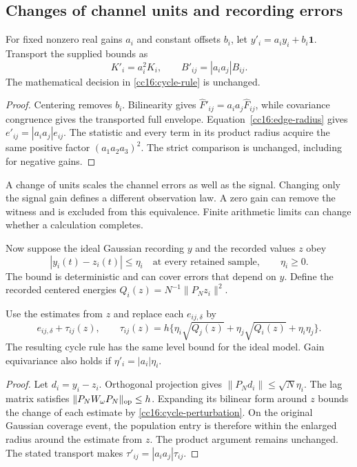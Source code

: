 \subsection{Changes of channel units and recording errors}

\begin{proposition}
\label{cc16:gain}
For fixed nonzero real gains $a_i$ and constant offsets $b_i$, let $y'_i=a_iy_i+b_i\mathbf1$. Transport the supplied bounds as
\[
 K'_i=a_i^2K_i,\qquad B'_{ij}=|a_ia_j|B_{ij}.
\]
The mathematical decision in \eqref{cc16:cycle-rule} is unchanged.
\end{proposition}
\begin{proof}
Centering removes $b_i$. Bilinearity gives $\widehat F'_{ij}=a_ia_j\widehat F_{ij}$, while covariance congruence gives the transported full envelope. Equation~\eqref{cc16:edge-radius} gives $e'_{ij}=|a_ia_j|e_{ij}$. The statistic and every term in its product radius acquire the same positive factor $(a_1a_2a_3)^2$. The strict comparison is unchanged, including for negative gains.
\end{proof}

A change of units scales the channel errors as well as the signal. Changing only the signal gain defines a different observation law. A zero gain can remove the witness and is excluded from this equivalence. Finite arithmetic limits can change whether a calculation completes.

Now suppose the ideal Gaussian recording $y$ and the recorded values $z$ obey
\begin{equation}
 |y_i(t)-z_i(t)|\le\eta_i
 \quad\text{at every retained sample},\qquad \eta_i\ge0.
 \label{cc16:recorder}
\end{equation}
The bound is deterministic and can cover errors that depend on $y$. Define the recorded centered energies
$Q_i(z)=N^{-1}\|P_Nz_i\|^2$.

\begin{proposition}
\label{cc16:cycle-rounding}
Use the estimates from $z$ and replace each $e_{ij,\delta}$ by
\begin{equation}
 e_{ij,\delta}+\tau_{ij}(z),\qquad
 \tau_{ij}(z)=h\{
 \eta_i\sqrt{Q_j(z)}+\eta_j\sqrt{Q_i(z)}+\eta_i\eta_j\}.
 \label{cc16:cycle-perturbation}
\end{equation}
The resulting cycle rule has the same level bound for the ideal model. Gain equivariance also holds if $\eta'_i=|a_i|\eta_i$.
\end{proposition}
\begin{proof}
Let $d_i=y_i-z_i$. Orthogonal projection gives $\|P_Nd_i\|\le\sqrt N\eta_i$. The lag matrix satisfies $\|P_NW_\omega P_N\|_{\rm op}\le h$. Expanding its bilinear form around $z$ bounds the change of each estimate by \eqref{cc16:cycle-perturbation}. On the original Gaussian coverage event, the population entry is therefore within the enlarged radius around the estimate from $z$. The product argument remains unchanged. The stated transport makes $\tau'_{ij}=|a_ia_j|\tau_{ij}$.
\end{proof}

